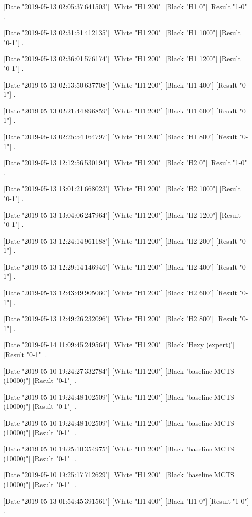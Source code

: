{[Date "2019-05-13 02:05:37.641503"]
[White "H1 200"]
[Black "H1 0"]
[Result "1-0"]
.

[Date "2019-05-13 02:31:51.412135"]
[White "H1 200"]
[Black "H1 1000"]
[Result "0-1"]
.

[Date "2019-05-13 02:36:01.576174"]
[White "H1 200"]
[Black "H1 1200"]
[Result "0-1"]
.

[Date "2019-05-13 02:13:50.637708"]
[White "H1 200"]
[Black "H1 400"]
[Result "0-1"]
.

[Date "2019-05-13 02:21:44.896859"]
[White "H1 200"]
[Black "H1 600"]
[Result "0-1"]
.

[Date "2019-05-13 02:25:54.164797"]
[White "H1 200"]
[Black "H1 800"]
[Result "0-1"]
.

[Date "2019-05-13 12:12:56.530194"]
[White "H1 200"]
[Black "H2 0"]
[Result "1-0"]
.

[Date "2019-05-13 13:01:21.668023"]
[White "H1 200"]
[Black "H2 1000"]
[Result "0-1"]
.

[Date "2019-05-13 13:04:06.247964"]
[White "H1 200"]
[Black "H2 1200"]
[Result "0-1"]
.

[Date "2019-05-13 12:24:14.961188"]
[White "H1 200"]
[Black "H2 200"]
[Result "0-1"]
.

[Date "2019-05-13 12:29:14.146946"]
[White "H1 200"]
[Black "H2 400"]
[Result "0-1"]
.

[Date "2019-05-13 12:43:49.905060"]
[White "H1 200"]
[Black "H2 600"]
[Result "0-1"]
.

[Date "2019-05-13 12:49:26.232096"]
[White "H1 200"]
[Black "H2 800"]
[Result "0-1"]
.

[Date "2019-05-14 11:09:45.249564"]
[White "H1 200"]
[Black "Hexy (expert)"]
[Result "0-1"]
.

[Date "2019-05-10 19:24:27.332784"]
[White "H1 200"]
[Black "baseline MCTS (10000)"]
[Result "0-1"]
.

[Date "2019-05-10 19:24:48.102509"]
[White "H1 200"]
[Black "baseline MCTS (10000)"]
[Result "0-1"]
.

[Date "2019-05-10 19:24:48.102509"]
[White "H1 200"]
[Black "baseline MCTS (10000)"]
[Result "0-1"]
.

[Date "2019-05-10 19:25:10.354975"]
[White "H1 200"]
[Black "baseline MCTS (10000)"]
[Result "0-1"]
.

[Date "2019-05-10 19:25:17.712629"]
[White "H1 200"]
[Black "baseline MCTS (10000)"]
[Result "0-1"]
.

[Date "2019-05-13 01:54:45.391561"]
[White "H1 400"]
[Black "H1 0"]
[Result "1-0"]
.

}
